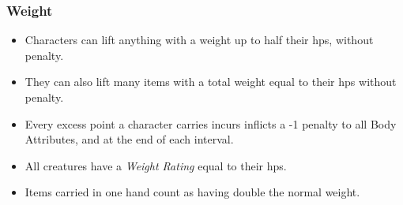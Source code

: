 \subsubsection*{Weight}

\begin{itemize}
  \item
  Characters can lift anything with a \gls{weight} up to half their \glspl{hp}, without penalty.
  \item
  They can also lift many items with a total \gls{weight} equal to their \glspl{hp} without penalty.
  \item
  Every excess point a character carries incurs inflicts a -1 penalty to all Body Attributes, and  at the end of each \gls{interval}.
  \item
  All creatures have a \textit{Weight Rating} equal to their \glspl{hp}.
  \item
  Items carried in one hand count as having double the normal \gls{weight}.
\end{itemize}
